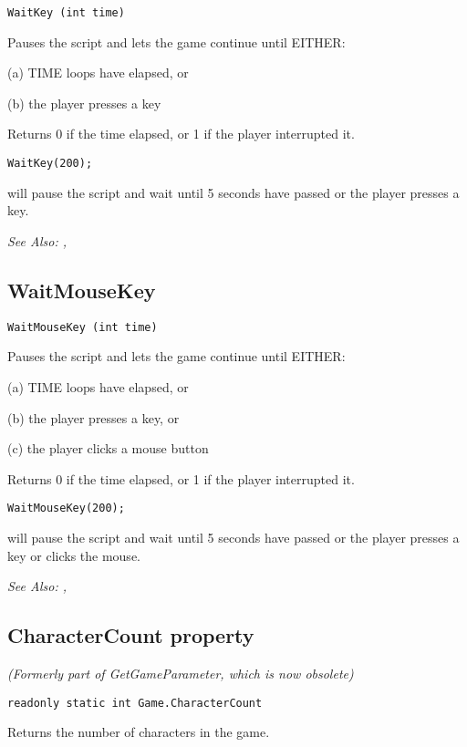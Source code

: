 \begin{verbatim}
WaitKey (int time)
\end{verbatim}
Pauses the script and lets the game continue until EITHER:

(a) TIME loops have elapsed, or

(b) the player presses a key

Returns 0 if the time elapsed, or 1 if the player interrupted it.

\begin{verbatim}
WaitKey(200);
\end{verbatim}
will pause the script and wait until 5 seconds have passed or the player presses a key.

\it{See Also:} , 

\subsection{WaitMouseKey}\label{WaitMouseKey}%

\begin{verbatim}
WaitMouseKey (int time)
\end{verbatim}
Pauses the script and lets the game continue until EITHER:

(a) TIME loops have elapsed, or

(b) the player presses a key, or

(c) the player clicks a mouse button

Returns 0 if the time elapsed, or 1 if the player interrupted it.

\begin{verbatim}
WaitMouseKey(200);
\end{verbatim}
will pause the script and wait until 5 seconds have passed or the player presses a key or
clicks the mouse.

\it{See Also:} , 


\subsection{CharacterCount property}\label{Game.CharacterCount}%

\it{(Formerly part of GetGameParameter, which is now obsolete)}

\begin{verbatim}
readonly static int Game.CharacterCount
\end{verbatim}
Returns the number of characters in the game.

